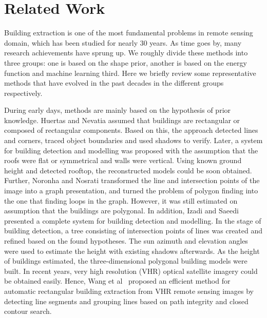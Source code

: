 \section{Related Work}
\label{Sec:RelatedWork}


Building extraction is one of the most fundamental problems in remote sensing domain, which has been studied for nearly 30 years. 
As time goes by, many research achievements have sprung up. 
We roughly divide these methods into three groups: one is based on the shape prior, another is based on the energy function and machine learning third. 
Here we briefly review some representative methods that have evolved in the past decades in the different groups respectively.



During early days, methods are mainly based on the hypothesis of prior knowledge.
Huertas and Nevatia \cite{IEEEexample:huertas1988detecting} assumed that buildings are rectangular or composed of rectangular components.
Based on this, the approach detected lines and corners, traced object boundaries and used shadows to verify. 
Later, a system \cite{IEEEexample:noronha2001detection} for building detection and modelling was proposed with the assumption that the roofs were flat or symmetrical and walls were vertical. 
Using known ground height and detected rooftop, the reconstructed models could be soon obtained. 
Further, Noronha and Nosrati \cite{IEEEexample:nosrati2009novel} transformed the line and intersection points of the image into a graph presentation, and turned the problem of polygon finding into the one that finding loops in the graph. 
However, it was still estimated on assumption that the buildings are polygonal. 
In addition, Izadi and Saeedi\cite{IEEEexample:izadi2012three} presented a complete system for building detection and modelling. 
In the stage of building detection, a tree consisting of intersection points of lines was created and refined based on the found hypotheses. 
The sun azimuth and elevation angles were used to estimate the height with existing shadows afterwards. 
As the height of buildings estimated, the three-dimensional polygonal building models were built. 
In recent years, very high resolution (VHR) optical satellite imagery could be obtained easily. 
Hence, Wang et al~\cite{IEEEexample:wang2015efficient} proposed an efficient method for automatic rectangular building extraction from VHR remote sensing images by detecting line segments and grouping lines based on path integrity and closed contour search.


